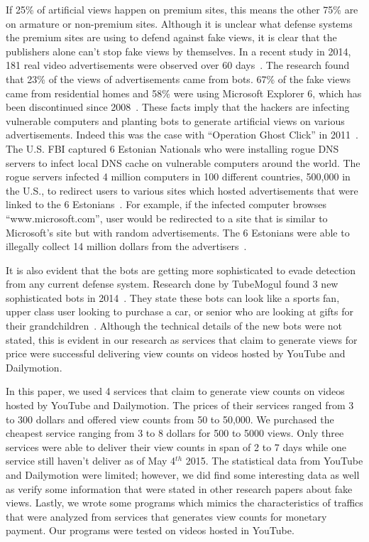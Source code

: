 \documentclass[conference]{IEEEtran}
\begin{document}
If 25\% of artificial views happen on premium sites, this means the other 75\% are on armature or non-premium sites. Although it is unclear what defense systems the premium sites are using to defend against fake views, it is clear that the publishers alone can’t stop fake views by themselves. In a recent study in 2014, 181 real video advertisements were observed over 60 days~\cite{c19}. The research found that 23\% of the views of advertisements came from bots. 67\% of the fake views came from residential homes and 58\% were using Microsoft Explorer 6, which has been discontinued since 2008~\cite{c19}. These facts imply that the hackers are infecting vulnerable computers and planting bots to generate artificial views on various advertisements. Indeed this was the case with “Operation Ghost Click” in 2011~\cite{c3, c4}. The U.S. FBI captured 6 Estonian Nationals who were installing rogue DNS servers to infect local DNS cache on vulnerable computers around the world. The rogue servers infected 4 million computers in 100 different countries, 500,000 in the U.S., to redirect users to various sites which hosted advertisements that were linked to the 6 Estonians~\cite{c4}. For example, if the infected computer browses “www.microsoft.com”, user would be redirected to a site that is similar to Microsoft’s site but with random advertisements. The 6 Estonians were able to illegally collect 14 million dollars from the advertisers~\cite{c4}.

It is also evident that the bots are getting more sophisticated to evade detection from any current defense system. Research done by TubeMogul found 3 new sophisticated bots in 2014~\cite{c2}. They state these bots can look like a sports fan, upper class user looking to purchase a car, or senior who are looking at gifts for their grandchildren~\cite{c2}. Although the technical details of the new bots were not stated, this is evident in our research as services that claim to generate views for price were successful delivering view counts on videos hosted by YouTube and Dailymotion.

In this paper, we used 4 services that claim to generate view counts on videos hosted by YouTube and Dailymotion. The prices of their services ranged from 3 to 300 dollars and offered view counts from 50 to 50,000. We purchased the cheapest service ranging from 3 to 8 dollars for 500 to 5000 views. Only three services were able to deliver their view counts in span of 2 to 7 days while one service still haven’t deliver as of May 4$^{th}$ 2015. The statistical data from YouTube and Dailymotion were limited; however, we did find some interesting data as well as verify some information that were stated in other research papers about fake views. Lastly, we wrote some programs which mimics the characteristics of traffics that were analyzed from services that generates view counts for monetary payment. Our programs were tested on videos hosted in YouTube.
\end{document}
